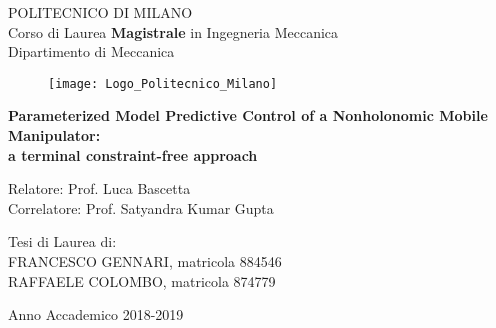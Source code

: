 \thispagestyle{empty}
\vspace*{-2cm} \bfseries{
\begin{center}
  \large
  POLITECNICO DI MILANO\\
  \normalsize
  Corso di Laurea \textbf{Magistrale} in Ingegneria Meccanica\\
  Dipartimento di Meccanica\\
  \begin{figure}[htbp]
    \begin{center}
      \texttt{[image: Logo\_Politecnico\_Milano]}
	 \centering
    \end{center}
  \end{figure}
  \vspace*{0.3cm} \LARGE


  \textbf{Parameterized Model Predictive Control of a Nonholonomic Mobile Manipulator: \\ a terminal constraint-free approach}\\


\end{center}
\vspace*{1.3cm} \large
\begin{flushleft}


  Relatore: Prof. Luca Bascetta \\
  Correlatore: Prof. Satyandra Kumar Gupta\\
 

\end{flushleft}
\vspace*{1.4cm}
\begin{flushright}


  Tesi di Laurea di:\\ FRANCESCO GENNARI, matricola 884546 \\
  RAFFAELE COLOMBO, matricola 874779 \\

\end{flushright}
\vspace*{1.23cm}
\begin{center}


  Anno Accademico 2018-2019
\end{center} \clearpage
}

